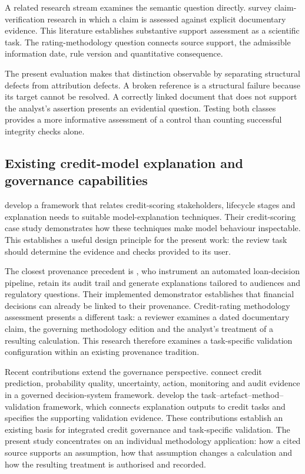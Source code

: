 \documentclass[11pt,a4paper]{article}
\begin{document}
A related research stream examines the semantic question directly. \citet{zerong2025} survey claim-verification research in which a claim is assessed against explicit documentary evidence. This literature establishes substantive support assessment as a scientific task. The rating-methodology question connects source support, the admissible information date, rule version and quantitative consequence.

The present evaluation makes that distinction observable by separating structural defects from attribution defects. A broken reference is a structural failure because its target cannot be resolved. A correctly linked document that does not support the analyst's assertion presents an evidential question. Testing both classes provides a more informative assessment of a control than counting successful integrity checks alone.

\subsection{Existing credit-model explanation and governance capabilities}

\citet{bucker2022} develop a framework that relates credit-scoring stakeholders, lifecycle stages and explanation needs to suitable model-explanation techniques. Their credit-scoring case study demonstrates how these techniques make model behaviour inspectable. This establishes a useful design principle for the present work: the review task should determine the evidence and checks provided to its user.

The closest provenance precedent is \citet{huynh2021}, who instrument an automated loan-decision pipeline, retain its audit trail and generate explanations tailored to audiences and regulatory questions. Their implemented demonstrator establishes that financial decisions can already be linked to their provenance. Credit-rating methodology assessment presents a different task: a reviewer examines a dated documentary claim, the governing methodology edition and the analyst's treatment of a resulting calculation. This research therefore examines a task-specific validation configuration within an existing provenance tradition.

Recent contributions extend the governance perspective. \citet{khalili2026} connect credit prediction, probability quality, uncertainty, action, monitoring and audit evidence in a governed decision-system framework. \citet{xie2026} develop the task--artefact--method--validation framework, which connects explanation outputs to credit tasks and specifies the supporting validation evidence. These contributions establish an existing basis for integrated credit governance and task-specific validation. The present study concentrates on an individual methodology application: how a cited source supports an assumption, how that assumption changes a calculation and how the resulting treatment is authorised and recorded.
\end{document}
